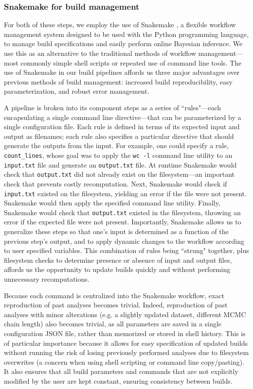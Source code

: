 \subsubsection{Snakemake for build management}

For both of these steps, we employ the use of Snakemake \cite{snakemake}, a flexible workflow management system designed to be used with the Python programming language, to manage build specifications and easily perform online Bayesian inference.
We use this as an alternative to the traditional methods of workflow management---most commonly simple shell scripts or repeated use of command line tools.
The use of Snakemake in our build pipelines affords us three major advantages over previous methods of build management: increased build reproducibility, easy parameterization, and robust error management.

A pipeline is broken into its component steps as a series of ``rules"---each encapsulating a single command line directive---that can be parameterized by a single configuration file.
Each rule is defined in terms of its expected input and output as filenames; each rule also specifies a particular directive that should generate the outputs from the input.
For example, one could specify a rule, \texttt{count\_lines}, whose goal was to apply the \texttt{wc -l} command line utility to an \texttt{input.txt} file and generate an \texttt{output.txt} file.
At runtime Snakemake would check that \texttt{output.txt} did not already exist on the filesystem---an important check that prevents costly recomputation.
Next, Snakemake would check if \texttt{input.txt} existed on the filesystem, yielding an error if the file were not present.
Snakemake would then apply the specified command line utility.
Finally, Snakemake would check that \texttt{output.txt} existed in the filesystem, throwing an error if the expected file were not present.
Importantly, Snakemake allows us to generalize these steps so that one's input is determined as a function of the previous step's output, and to apply dynamic changes to the workflow according to user specified variables.
This combination of rules being ``strung" together, plus filesystem checks to determine presence or absence of input and output files, affords us the opportunity to update builds quickly and without performing unnecessary recomputations.

Because each command is centralized into the Snakemake workflow, exact reproduction of past analyses becomes trivial.
Indeed, reproduction of past analyses with minor alterations (e.g. a slightly updated dataset, different MCMC chain length) also becomes trivial, as all parameters are saved in a single configuration JSON file, rather than memorized or stored in shell history.
This is of particular importance because it allows for easy specification of updated builds without running the risk of losing previously performed analyses due to filesystem overwrites (a concern when using shell scripting or command line copy/pasting).
It also ensures that all build parameters and commands that are not explicitly modified by the user are kept constant, ensuring consistency between builds.

